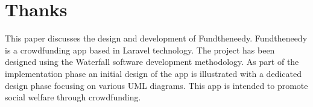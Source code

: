 \chapter*{Thanks}
\thispagestyle{empty}
%
This paper discusses the design and development of Fundtheneedy. Fundtheneedy is a crowdfunding app based in Laravel technology. The project has been designed using the Waterfall software development methodology. As part of the implementation phase an initial design of the app is illustrated with a dedicated design phase focusing on various UML diagrams. This app is intended to promote social welfare through crowdfunding.
